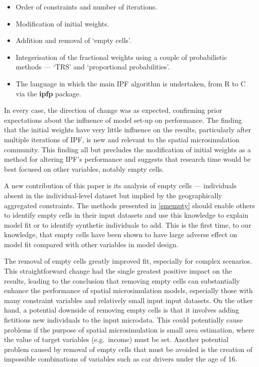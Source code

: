 \documentclass[a4paper,10pt]{article}
\begin{document}
\begin{itemize}
 \item Order of constraints and number of iterations.
 \item Modification of initial weights.
 \item Addition and removal of `empty cells'.
 \item Integerisation of the fractional weights using a couple of probabilistic methods ---
 `TRS' and `proportional probabilities'.
 \item The language in which the main IPF algorithm is undertaken, from R to C via the \textbf{ipfp} package.
\end{itemize}

In every case, the direction of change was as expected, confirming
prior expectations about the influence of model set-up on performance. The finding
that the initial weights have very little influence on the results, particularly
after multiple iterations of IPF, is new and relevant to the spatial microsimulation
community. This finding all but precludes the modification of initial weights as
a method for altering IPF's performance and suggests that research time would be
best focused on other variables, notably empty cells.

A new contribution of this paper is its analysis
of empty cells --- individuals absent in the individual-level dataset but
implied by the geographically aggregated constraints.
The methods presented in \cref{smempty} should enable others to
identify empty cells in their input datasets and use this knowledge to
explain model fit or to identify synthetic individuals to add.
This is the first time, to our knowledge, that empty cells have been shown to have
large adverse effect on model fit compared with other variables in model design.

The removal of empty cells greatly improved fit,
especially for complex scenarios. This straightforward change had
the single greatest positive impact on the results, leading to the
conclusion that removing empty cells can substantially enhance the performance of
spatial microsimulation models, especially those with many constraint variables and relatively
small input input datasets.
On the other hand, a potential downside of removing empty cells is that it involves adding fictitious
new individuals to the input microdata. This could potentially cause problems if the
purpose of spatial microsimulation is small area estimation, where the
value of target variables (e.g.~income) must be set.
Another potential problem caused by removal of empty cells that must be avoided is
the creation of impossible combinations of variables such as car drivers under
the age of 16.
\end{document}
